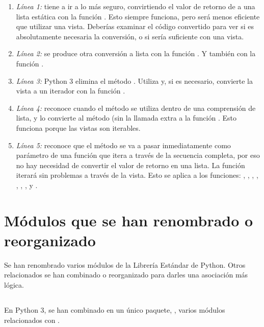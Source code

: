\begin{enumerate}
  \item \emph{Línea 1:}  tiene a ir a lo más seguro, convirtiendo el valor de retorno de  a una lista estática con la función . Esto siempre funciona, pero será menos eficiente que utilizar una vista. Deberías examinar el código convertido para ver si es absolutamente necesaria la conversión, o si sería suficiente con una vista.
  \item \emph{Línea 2:} se produce otra conversión a lista con la función . Y también con la función .
  \item \emph{Línea 3:} Python 3 elimina el método . Utiliza  y, si es necesario, convierte la vista a un iterador con la función .
  \item \emph{Línea 4:}  reconoce cuando el método  se utiliza dentro de una comprensión de lista, y  lo convierte al método  (sin la llamada extra a la función . Esto funciona porque las vistas son iterables.
  \item \emph{Línea 5:}  reconoce que el método  se va a pasar inmediatamente como parámetro de una función que itera a través de la secuencia completa, por eso no hay necesidad de convertir el valor de retorno en una lista. La función  iterará sin problemas a través de la vista. Esto se aplica a los funciones: , , , , , , ,  y .
\end{enumerate}

\section{Módulos que se han renombrado o reorganizado}

Se han renombrado varios módulos de la Librería Estándar de Python. Otros relacionados se han combinado o reorganizado para darles una asociación más lógica.

\subsection{}

En Python 3, se han combinado en un único paquete, , varios módulos relacionados con .


